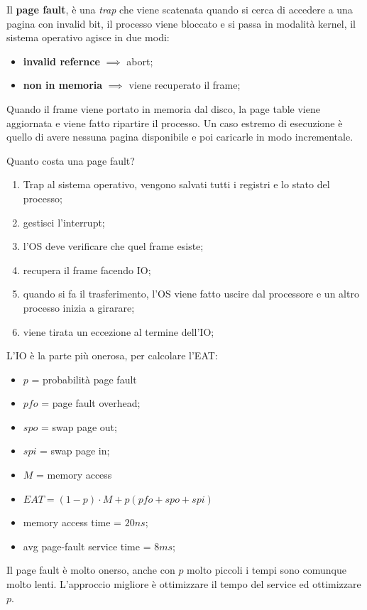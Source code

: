 \documentclass[12pt]{article}
\begin{document}
Il \textbf{page fault}, \`e una \emph{trap} che viene scatenata quando si cerca di accedere a una pagina con invalid bit, il processo viene bloccato e si passa in modalit\`a kernel, il sistema operativo agisce in due modi:
\begin{itemize}
  \item \textbf{invalid refernce} $ \implies$ abort;
  \item \textbf{non in memoria} $ \implies$ viene recuperato il frame;
\end{itemize}
Quando il frame viene portato in memoria dal disco, la page table viene aggiornata e viene fatto ripartire il processo. Un caso estremo di esecuzione \`e quello di avere nessuna pagina disponibile e poi caricarle in modo incrementale.

Quanto costa una page fault?
\begin{enumerate}
  \item Trap al sistema operativo, vengono salvati tutti i registri e lo stato del processo;
  \item gestisci l'interrupt;
  \item l'OS deve verificare che quel frame esiste;
  \item recupera il frame facendo IO;
  \item quando si fa il trasferimento, l'OS viene fatto uscire dal processore e un altro processo inizia a girarare;
  \item viene tirata un eccezione al termine dell'IO;
\end{enumerate}
L'IO \`e la parte pi\`u onerosa, per calcolare l'EAT:
\begin{itemize}
  \item $p$ = probabilit\`a page fault
  \item $pfo$ = page fault overhead;
  \item $spo$ = swap page out;
  \item $spi$ = swap page in;
  \item $M$ = memory access
  \item $EAT = (1-p)\cdot M + p (pfo + spo + spi)$
\end{itemize}
\begin{example}{}{}
  \begin{itemize}
    \item memory access time = $20ns$;
    \item avg page-fault service time = $8ms$;
  \end{itemize}

  Il page fault \`e molto onerso, anche con $p$ molto piccoli i tempi sono comunque molto lenti. L'approccio migliore \`e ottimizzare il tempo del service ed ottimizzare $p$.
\end{example}
\end{document}
